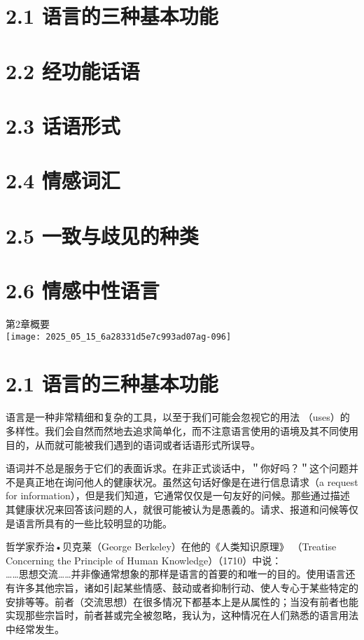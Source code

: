 \section*{2.1 语言的三种基本功能}
\section*{2.2 经功能话语}
\section*{2.3 话语形式}
\section*{2.4 情感词汇}
\section*{2.5 一致与歧见的种类}
\section*{2.6 情感中性语言}
第2章概要\\
\texttt{[image: 2025\_05\_15\_6a28331d5e7c993ad07ag-096]}

\section*{2.1 语言的三种基本功能}
语言是一种非常精细和复杂的工具，以至于我们可能会忽视它的用法 （uses）的多样性。我们会自然而然地去追求简单化，而不注意语言使用的语境及其不同使用目的，从而就可能被我们遇到的语词或者话语形式所误导。

语词并不总是服务于它们的表面诉求。在非正式谈话中，＂你好吗？＂这个问题并不是真正地在询问他人的健康状况。虽然这句话好像是在进行信息请求（a request for information），但是我们知道，它通常仅仅是一句友好的问候。那些通过描述其健康状况来回答该问题的人，就很可能被认为是愚義的。请求、报道和问候等仅是语言所具有的一些比较明显的功能。

哲学家乔治•贝克莱（George Berkeley）在他的《人类知识原理》 （Treatise Concerning the Principle of Human Knowledge）（1710）中说：\\
……思想交流……并非像通常想象的那样是语言的首要的和唯一的目的。使用语言还有许多其他宗旨，诸如引起某些情感、鼓动或者抑制行动、使人专心于某些特定的安排等等。前者（交流思想）在很多情况下都基本上是从属性的；当没有前者也能实现那些宗旨时，前者甚或完全被忽略，我认为，这种情况在人们熟悉的语言用法中经常发生。

